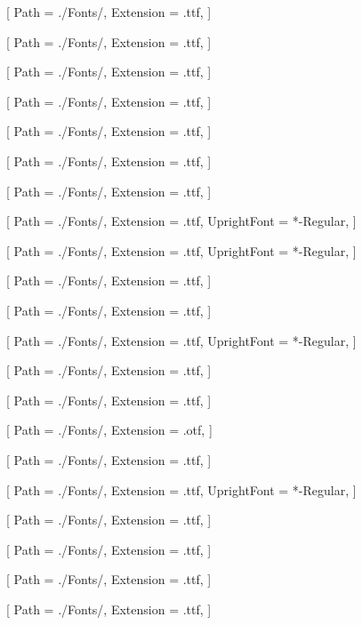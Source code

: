 \usepackage[margin=1in]{geometry}
\usepackage{amssymb,amsmath}
\usepackage{fontspec}
\usepackage{polyglossia}


[
Path = ./Fonts/,
Extension = .ttf, 
]

[
Path = ./Fonts/,
Extension = .ttf, 
]

[
Path = ./Fonts/,
Extension = .ttf, 
]

[
Path = ./Fonts/,
Extension = .ttf, 
]

[
Path = ./Fonts/,
Extension = .ttf, 
]

[
Path = ./Fonts/,
Extension = .ttf,
]

[
Path = ./Fonts/,
Extension = .ttf,
]

[
Path = ./Fonts/,
Extension = .ttf,
UprightFont = *-Regular,
]

[
Path = ./Fonts/,
Extension = .ttf, 
UprightFont = *-Regular,
]

[
Path = ./Fonts/,
Extension = .ttf,
]

[
Path = ./Fonts/,
Extension = .ttf,
]

[
Path = ./Fonts/,
Extension = .ttf, 
UprightFont = *-Regular, 
]

[
Path = ./Fonts/,
Extension = .ttf,
]

[
Path = ./Fonts/,
Extension = .ttf, 
]

[
Path = ./Fonts/,
Extension = .otf,
]

[
Path = ./Fonts/,
Extension = .ttf,
]

[
Path = ./Fonts/,
Extension = .ttf,
UprightFont = *-Regular,
]

[
Path = ./Fonts/,
Extension = .ttf,
]

[
Path = ./Fonts/,
Extension = .ttf,
]

[
Path = ./Fonts/,
Extension = .ttf,
]

[
Path = ./Fonts/,
Extension = .ttf,
]

